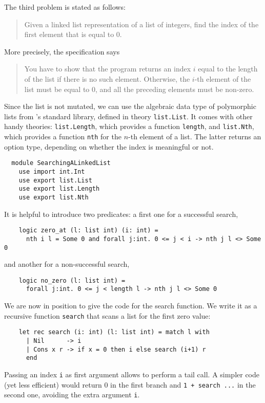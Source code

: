 The third problem is stated as follows:
\begin{quote}
  Given a linked list representation of a list of integers,
  find the index of the first element that is equal to 0.
\end{quote}
More precisely, the specification says
\begin{quote}
  You have to show that the program returns an index $i$ equal to the
  length of the list if there is no such element. Otherwise, the $i$-th
  element of the list must be equal to 0, and all the preceding
  elements must be non-zero.
\end{quote}
Since the list is not mutated, we can use the algebraic data type of
polymorphic lists from \why's standard library, defined in theory
\texttt{list.List}. It comes with other handy theories:
\texttt{list.Length}, which provides a function \texttt{length}, and
\texttt{list.Nth}, which provides a function \texttt{nth}
for the $n$-th element of a list. The latter returns an option type,
depending on whether the index is meaningful or not.
\begin{verbatim}
  module SearchingALinkedList
    use import int.Int
    use export list.List
    use export list.Length
    use export list.Nth
\end{verbatim}
It is helpful to introduce two predicates: a first one
for a successful search,
\begin{verbatim}
    logic zero_at (l: list int) (i: int) =
      nth i l = Some 0 and forall j:int. 0 <= j < i -> nth j l <> Some 0
\end{verbatim}
and another for a non-successful search,
\begin{verbatim}
    logic no_zero (l: list int) =
      forall j:int. 0 <= j < length l -> nth j l <> Some 0
\end{verbatim}
We are now in position to give the code for the search function.
We write it as a recursive function \texttt{search} that scans a list
for the first zero value:
\begin{verbatim}
    let rec search (i: int) (l: list int) = match l with
      | Nil      -> i
      | Cons x r -> if x = 0 then i else search (i+1) r
      end
\end{verbatim}
Passing an index \texttt{i} as first argument allows to perform a tail
call. A simpler code (yet less efficient) would return 0 in the first
branch and \texttt{1 + search ...} in the second one, avoiding the
extra argument \texttt{i}.

